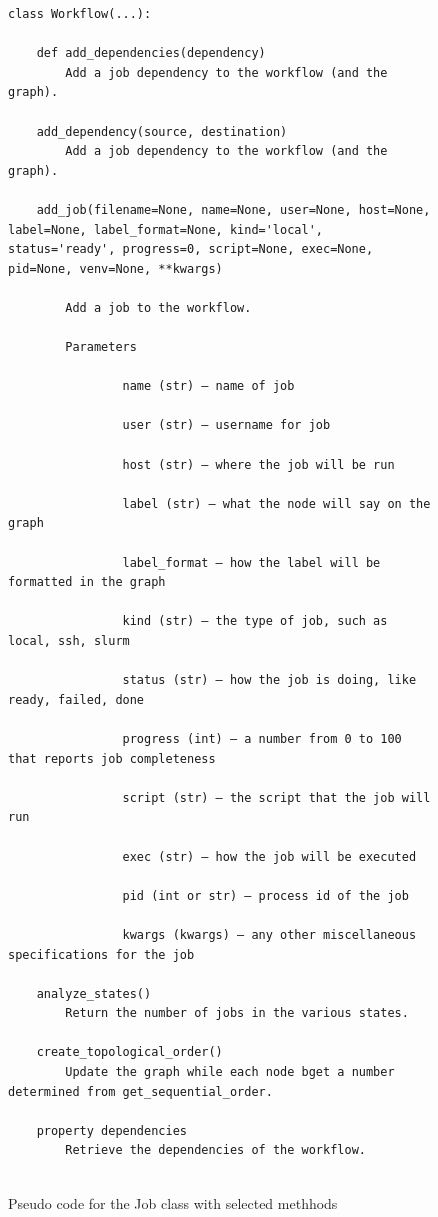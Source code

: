 \begin{figure}[htb]
\caption{Pseudo code for the Job class with selected methhods}
\label{fig:code-workflow}
\begin{verbatim}
class Workflow(...):

    def add_dependencies(dependency)
        Add a job dependency to the workflow (and the graph).

    add_dependency(source, destination)
        Add a job dependency to the workflow (and the graph).

    add_job(filename=None, name=None, user=None, host=None, label=None, label_format=None, kind='local', status='ready', progress=0, script=None, exec=None, pid=None, venv=None, **kwargs)

        Add a job to the workflow.

        Parameters

                name (str) – name of job

                user (str) – username for job

                host (str) – where the job will be run

                label (str) – what the node will say on the graph

                label_format – how the label will be formatted in the graph

                kind (str) – the type of job, such as local, ssh, slurm

                status (str) – how the job is doing, like ready, failed, done

                progress (int) – a number from 0 to 100 that reports job completeness

                script (str) – the script that the job will run

                exec (str) – how the job will be executed

                pid (int or str) – process id of the job

                kwargs (kwargs) – any other miscellaneous specifications for the job

    analyze_states()
        Return the number of jobs in the various states.

    create_topological_order()
        Update the graph while each node bget a number determined from get_sequential_order.

    property dependencies
        Retrieve the dependencies of the workflow.


\end{verbatim}
\end{figure}

